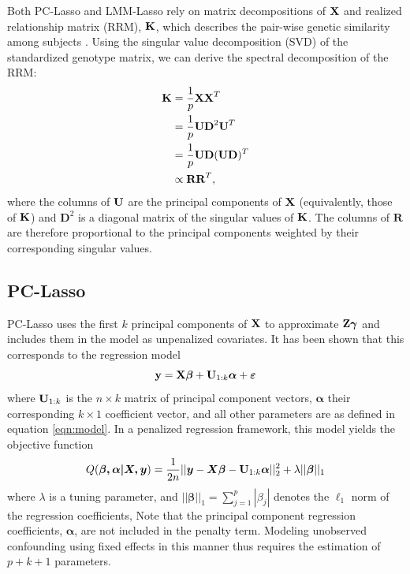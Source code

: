Both PC-Lasso and LMM-Lasso rely on matrix decompositions of $\textbf{X}$ and realized relationship matrix (RRM), $\textbf{K}$, which describes the pair-wise genetic similarity among subjects \cite{hayes2009increased}. Using the singular value decomposition (SVD) of the standardized genotype matrix, we can derive the spectral decomposition of the RRM: 
\begin{align}
    \label{eqn:k}
    \textbf{K} &= \frac{1}{p} \textbf{X} \textbf{X}^T \nonumber \\
                   &= \frac{1}{p} \textbf{U} \textbf{D}^2 \textbf{U}^T \nonumber \\
                   &= \frac{1}{p} \textbf{U} \textbf{D} (\textbf{U} \textbf{D})^T \nonumber \\
                   &\propto \textbf{R} \textbf{R}^T,
\end{align}
where the columns of $\textbf{U}$ are the principal components of $\textbf{X}$ (equivalently, those of $\textbf{K}$) and $\boldsymbol{D}^2$ is a diagonal matrix of the singular values of $\textbf{K}$. The columns of $\boldsymbol{R}$ are therefore proportional to the principal components weighted by their corresponding singular values. 

\subsection{PC-Lasso}
PC-Lasso uses the first $k$ principal components of $\textbf{X}$ to approximate $\textbf{Z}\boldsymbol{\gamma}$ and includes them in the model as unpenalized covariates. It has been shown \cite{hoffman2013correcting} that this corresponds to the regression model
\begin{equation}
    \label{eqn:pca_reg}
    \textbf{y} = \textbf{X}\boldsymbol{\beta} + \textbf{U}_{1:k}\boldsymbol{\alpha} + \boldsymbol{\varepsilon} 
\end{equation}
where $\textbf{U}_{1:k}$ is the $n \times k$ matrix of principal component vectors, $\boldsymbol{\alpha}$ their corresponding $k \times 1$ coefficient vector, and all other parameters are as defined in equation \ref{eqn:model}. In a penalized regression framework, this model yields the objective function
\begin{equation}
    \label{eqn:pca_obj}
    Q(\boldsymbol{\beta, \alpha| X, y}) = \frac{1}{2n} ||\boldsymbol{y} - \boldsymbol{X \beta} - \textbf{U}_{1:k}\boldsymbol{\alpha}||_2^2 + \lambda || \boldsymbol{\beta} ||_1
\end{equation}
where $\lambda$ is a tuning parameter, and $|| \boldsymbol{\beta} ||_1 = \sum_{j=1}^p |\beta_j|$ denotes the $\ell_1$ norm of the regression coefficients,  Note that the principal component regression coefficients, $\boldsymbol{\alpha}$, are not included in the penalty term. Modeling unobserved confounding using fixed effects in this manner thus requires the estimation of $p + k + 1$ parameters. 


